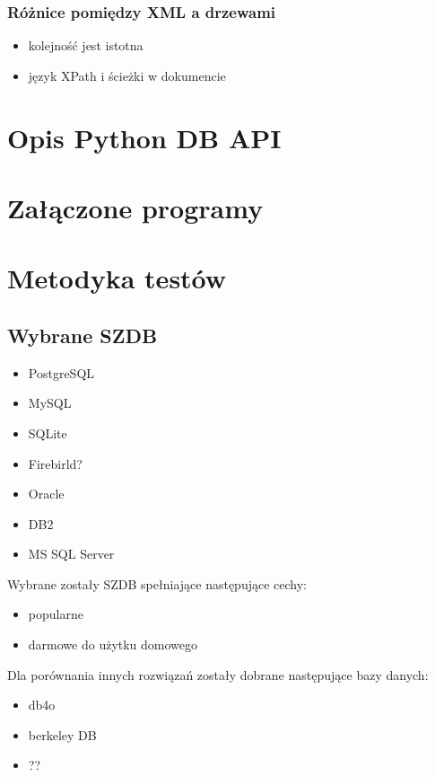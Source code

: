 \documentclass[10pt,a4paper,oneside]{book}
\begin{document}
\subsection{Różnice pomiędzy XML a drzewami}
\begin{itemize}
 \item kolejność jest istotna
 \item język XPath i ścieżki w dokumencie
\end{itemize}

\appendix

\chapter{Opis Python DB API}

\chapter{Załączone programy}

\chapter{Metodyka testów}
\section{Wybrane SZDB}
\begin{itemize}
 \item PostgreSQL
 \item MySQL
 \item SQLite
 \item Firebirld?
 \item Oracle
 \item DB2
 \item MS SQL Server
\end{itemize}


Wybrane zostały SZDB spełniające następujące cechy:
\begin{itemize}
 \item popularne
 \item darmowe do użytku domowego 
\end{itemize}


Dla porównania innych rozwiązań zostały dobrane następujące bazy danych:

\begin{itemize}
 \item db4o
 \item berkeley DB
 \item ??
\end{itemize}
\end{document}
